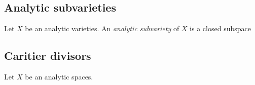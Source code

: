 

\subsection{Analytic subvarieties}

\begin{definition}
  Let $X$ be an analytic varieties.
  An \emph{analytic subvariety} of $X$ is a closed subspace \Yang{}
\end{definition}

\subsection{Caritier divisors}

\begin{definition}
  Let $X$ be an analytic spaces.
  \Yang{}
\end{definition}




